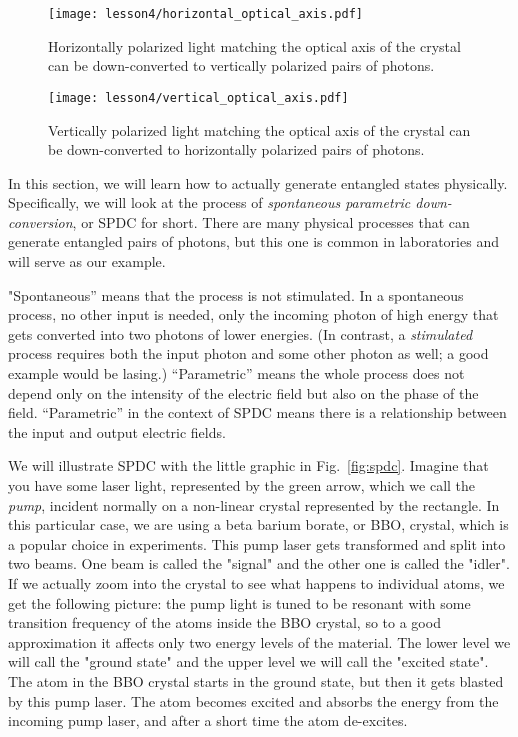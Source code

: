 \begin{figure}[H]
    \centering
    \texttt{[image: lesson4/horizontal\_optical\_axis.pdf]}
    
        \caption[Horizontal to vertical SPDC]{Horizontally polarized light matching the optical axis of the crystal can be down-converted to vertically polarized pairs of photons.}
    
    \label{fig:horizontal-opt-axis}
\end{figure}

\begin{figure}[H]
   \centering
    \texttt{[image: lesson4/vertical\_optical\_axis.pdf]}
    
        \caption[Vertical to horizontal SPDC]{Vertically polarized light matching the optical axis of the crystal can be down-converted to horizontally polarized pairs of photons.}
    
    \label{fig:vertical-opt-axis}
\end{figure}


In this section, we will learn how to actually generate entangled states physically. Specifically, we will look at the process of \emph{spontaneous parametric down-conversion}, or SPDC for short. There are many physical processes that can generate entangled pairs of photons, but this one is  common in laboratories and will serve as our example. 

"Spontaneous” means that the process is not stimulated.
In a spontaneous process, no other input is needed, only the incoming photon of high energy that gets converted into two photons of lower energies.
(In contrast, a \emph{stimulated} process requires both the input photon and some other photon as well; a good example would be lasing.) “Parametric” means the whole process does not depend only on the intensity of the electric field but also on the phase of the field. “Parametric” in the context of SPDC means there is a relationship between the input and output electric fields.

We will illustrate SPDC with the little graphic in Fig.~\ref{fig:spdc}. Imagine that you have some laser light, represented by the green arrow, which we call the \emph{pump}, incident normally on a non-linear crystal represented by the rectangle. In this particular case, we are using a beta barium borate, or BBO, crystal, which is a popular choice in experiments. This pump laser gets transformed and split into two beams. One beam is called the "signal" and the other one is called the "idler". If we actually zoom into the crystal to see what happens to individual atoms, we get the following picture: the pump light is tuned to be resonant with some transition frequency of the atoms inside the BBO crystal, so to a good approximation it affects only two energy levels of the material. The lower level we will call the "ground state" and the upper level we will call the "excited state". The atom in the BBO crystal starts in the ground state, but then it gets blasted by this pump laser.  The atom becomes excited and absorbs the energy from the incoming pump laser, and after a short time the atom de-excites.

